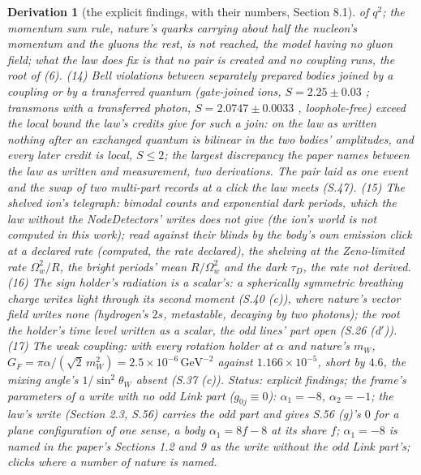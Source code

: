\documentclass[pdflatex,sn-mathphys-num]{sn-jnl}
\theoremstyle{thmstyleone}
\newtheorem{derivation}{Derivation}
\begin{document}
\begin{derivation}[the explicit findings, with their numbers, Section 8.1]
of $q^2$; the momentum sum rule, nature's quarks carrying about half the nucleon's momentum and the gluons the rest, is not reached, the model having no gluon field; what the law does fix is that no pair is created and no coupling runs, the root of (6). (14) Bell violations between separately prepared bodies joined by a coupling or by a transferred quantum (gate-joined ions, $S = 2.25 \pm 0.03$ \cite{rowe}; transmons with a transferred photon, $S = 2.0747 \pm 0.0033$ \cite{storz}, loophole-free) exceed the local bound the law's credits give for such a join: on the law as written nothing after an exchanged quantum is bilinear in the two bodies' amplitudes, and every later credit is local, $S \le 2$; the largest discrepancy the paper names between the law as written and measurement, two derivations. The pair laid as one event and the swap of two multi-part records at a click the law meets (S.47). (15) The shelved ion's telegraph: bimodal counts and exponential dark periods, which the law without the NodeDetectors' writes does not give (the ion's world is not computed in this work); read against their blinds by the body's own emission click at a declared rate (computed, the rate declared), the shelving at the Zeno-limited rate $\Omega_w^2 / R$, the bright periods' mean $R / \Omega_w^2$ and the dark $\tau_D$, the rate not derived. (16) The sign holder's radiation is a scalar's: a spherically symmetric breathing charge writes light through its second moment (S.40 (c)), where nature's vector field writes none (hydrogen's $2s$, metastable, decaying by two photons); the root the holder's time level written as a scalar, the odd lines' part open (S.26 (d$'$)). (17) The weak coupling: with every rotation holder at $\alpha$ and nature's $m_W$, $G_F = \pi\alpha / (\sqrt 2\,m_W^2) = 2.5 \times 10^{-6}\,\mathrm{GeV}^{-2}$ against $1.166 \times 10^{-5}$, short by $4.6$, the mixing angle's $1 / \sin^2\theta_W$ absent (S.37 (c)). \emph{Status:} explicit findings; the frame's parameters of a write with no odd Link part ($g_{0j} \equiv 0$): $\alpha_1 = -8$, $\alpha_2 = -1$; the law's write (Section 2.3, S.56) carries the odd part and gives S.56 (g)'s $0$ for a plane configuration of one sense, a body $\alpha_1 = 8f - 8$ at its share $f$; $\alpha_1 = -8$ is named in the paper's Sections 1.2 and 9 as the write without the odd Link part's; clicks where a number of nature is named.
\end{derivation}
\end{document}
